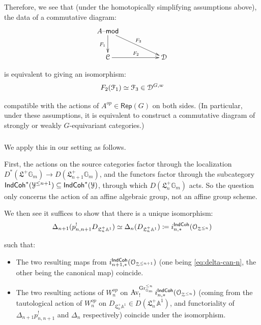 \documentclass[reqno,11pt]{amsart}
\numberwithin{equation}{subsection}
\theoremstyle{remark}
\newcommand{\bA}{{\mathbb A}}
\newcommand{\bG}{{\mathbb G}}
\newcommand{\sC}{{\EuScript C}}
\newcommand{\sD}{{\EuScript D}}
\newcommand{\sF}{{\EuScript F}}
\newcommand{\sO}{{\EuScript O}}
\newcommand{\sY}{{\EuScript Y}}
\newcommand{\sZ}{{\EuScript Z}}
\newcommand{\fL}{{\mathfrak L}}
\newcommand{\on}{\operatorname}
\newcommand{\mathendash}{\text{\textendash}}
\newcommand{\Rep}{\mathsf{Rep}}
\newcommand{\Gr}{\on{Gr}}
\renewcommand{\mod}{\mathendash\mathsf{mod}}
\newcommand{\Av}{\on{Av}}
\newcommand{\IndCoh}{\mathsf{IndCoh}}
\renewcommand{\subset}{\subseteq}
\begin{document}
Therefore, we see that (under the homotopically simplifying assumptions
above), the data of a commutative diagram:
%
\[
\xymatrix{
A\mod \ar[d]_{F_1} \ar[drr]^{F_3} && \\ 
\sC \ar[rr]^{F_2} && \sD 
}
\]

\noindent is equivalent to giving an isomorphism:
%
\[
F_2(\sF_1) \simeq \sF_3 \in \sD^{G,w}
\]

\noindent compatible with the actions of $A^{op} \in \Rep(G)$ on both sides.
(In particular, under these assumptions, it is equivalent to construct
a commutative diagram of strongly or weakly $G$-equivariant categories.)

\subsubsection{}

We apply this in our setting as follows. 

First, the actions on the source categories factor through the localization 
$D^*(\fL^+\bG_m) \to D(\fL_{n+1}^+\bG_m)$, and the functors
factor through the subcategory $\IndCoh^*(\sY^{\leq n+1}) \subset \IndCoh^*(\sY)$,
through which $D(\fL_n^+\bG_m)$ acts. So the question only concerns the
action of an affine algebraic group, not an affine group scheme. 

We then see
it suffices to show that there is a unique isomorphism:
%
\begin{equation}\label{eq:comm-iso}
\Delta_{n+1}(p_{n,n+1}^! D_{\fL_n^+ \bA^1}) 
\simeq 
\Delta_n(D_{\fL_n^+ \bA^1}) 
\coloneqq
i_{n,*}^{\IndCoh}(\sO_{\sZ^{\leq n}})
\end{equation}

\noindent such that: 

\begin{itemize}

\item The two resulting maps from $i_{n+1,*}^{\IndCoh}(\sO_{\sZ^{\leq n+1}})$
(one being \eqref{eq:delta-can-n}, the other being the canonical map)
coincide.

\item The two resulting actions of $W_n^{op}$ on 
$\Av_!^{\Gr_{\bG_m}^{\leq n}}i_{n,*}^{\IndCoh}(\sO_{\sZ^{\leq n}})$ (coming from 
the tautological action of 
$W_n^{op}$ on $D_{\fL_n^+\bA^1} \in D(\fL_n^+\bA^1)$, and functoriality of
$\Delta_{n+1}p_{n,n+1}^!$ and $\Delta_n$ respectively) coincide
under the isomorphism.

\end{itemize}
\end{document}
